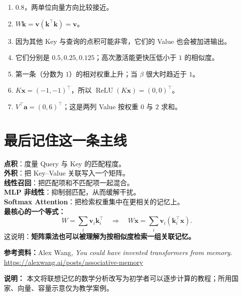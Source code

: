 \documentclass[11pt,a4paper,UTF8]{ctexart}
\numberwithin{equation}{section}
\newcommand{\vect}[1]{\boldsymbol{#1}}
\newcommand{\relu}{\operatorname{ReLU}}
\begin{document}
\begin{tcolorbox}[colback=paper,colframe=linegray,boxrule=.6pt,arc=1.5mm,title={\sffamily\bfseries 简明答案},fonttitle=\sffamily\bfseries,breakable]
\begin{enumerate}[label=\arabic*.]
\item $0.8$，两单位向量方向比较接近。
\item $W\vect{k}=\vect{v}(\vect{k}^\top\vect{k})=\vect{v}$。
\item 因为其他 Key 与查询的点积可能非零，它们的 Value 也会被加进输出。
\item 它们分别是 $0.5,0.25,0.125$；高次激活能更快压低小于 $1$ 的相似度。
\item 第一条（分数为 $1$）的相对权重上升；当 $\beta$ 很大时趋近于 $1$。
\item $K\vect{x}=(-1,-1)^\top$，所以 $\relu(K\vect{x})=(0,0)^\top$。
\item $V^\top\vect{a}=(0,6)^\top$；这是两列 Value 按权重 $0$ 与 $2$ 求和。
\end{enumerate}
\end{tcolorbox}

\section*{最后记住这一条主线}
\begin{conclusion}[title={一张脑中的路线图}]
\textbf{点积}：度量 Query 与 Key 的匹配程度。\\
\textbf{外积}：把 Key--Value 关联写入一个矩阵。\\
\textbf{线性召回}：把匹配项和不匹配项一起混合。\\
\textbf{MLP 非线性}：抑制弱匹配，从而缓解干扰。\\
\textbf{Softmax Attention}：把检索权重集中在更相关的记忆上。\\[2mm]
\textbf{最核心的一个等式：}
\[
\boxed{W=\sum_i\vect{v}_i\vect{k}_i^\top
\quad\Longrightarrow\quad W\vect{x}=\sum_i\vect{v}_i(\vect{k}_i^\top\vect{x}).}
\]
这说明：\textbf{矩阵乘法也可以被理解为按相似度检索一组关联记忆。}
\end{conclusion}

\vspace{7mm}
{\footnotesize\color{muted}
\noindent\textbf{参考资料：}Alex Wang, \emph{You could have invented transformers from memory}.\newline
\url{https://alexwang.ai/posts/associative-memory}
\par
\noindent\textbf{说明：} 本文将联想记忆的数学分析改写为初学者可以逐步计算的教程；所用国家、向量、容量示意仅为教学案例。
}
\end{document}

